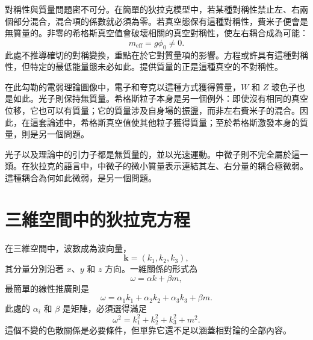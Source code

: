 \begin{classroomqa}
\end{classroomqa}

對稱性與質量問題密不可分。在簡單的狄拉克模型中，若某種對稱性禁止左、右兩個部分混合，混合項的係數就必須為零。若真空態保有這種對稱性，費米子便會是無質量的。非零的希格斯真空值會破壞相關的真空對稱性，使左右耦合成為可能：
\begin{equation}
m_{\mathrm{eff}}=g\phi_0\neq0.
\end{equation}
此處不推導確切的對稱變換，重點在於它對質量項的影響。方程或許具有這種對稱性，但特定的最低能量態未必如此。提供質量的正是這種真空的不對稱性。

在此勾勒的電弱理論圖像中，電子和夸克以這種方式獲得質量，\(W\) 和 \(Z\) 玻色子也是如此。光子則保持無質量。希格斯粒子本身是另一個例外：即使沒有相同的真空位移，它也可以有質量；它的質量涉及自身場的振盪，而非左右費米子的混合。因此，在這套論述中，希格斯真空值使其他粒子獲得質量；至於希格斯激發本身的質量，則是另一個問題。

\begin{classroomqa}
\end{classroomqa}

光子以及理論中的引力子都是無質量的，並以光速運動。中微子則不完全屬於這一類。在狄拉克的語言中，中微子的微小質量表示連結其左、右分量的耦合極微弱。這種耦合為何如此微弱，是另一個問題。

\section{三維空間中的狄拉克方程}

在三維空間中，波數成為波向量，
\begin{equation}
\mathbf{k}=(k_1,k_2,k_3),
\end{equation}
其分量分別沿著 \(x\)、\(y\) 和 \(z\) 方向。一維關係的形式為
\begin{equation}
\omega=\alpha k+\beta m,
\end{equation}
最簡單的線性推廣則是
\begin{equation}
\omega
=
\alpha_1 k_1+\alpha_2 k_2+\alpha_3 k_3+\beta m.
\end{equation}
此處的 \(\alpha_i\) 和 \(\beta\) 是矩陣，必須選得滿足
\begin{equation}
\omega^2=k_1^2+k_2^2+k_3^2+m^2.
\end{equation}
這個不變的色散關係是必要條件，但單靠它還不足以涵蓋相對論的全部內容。


